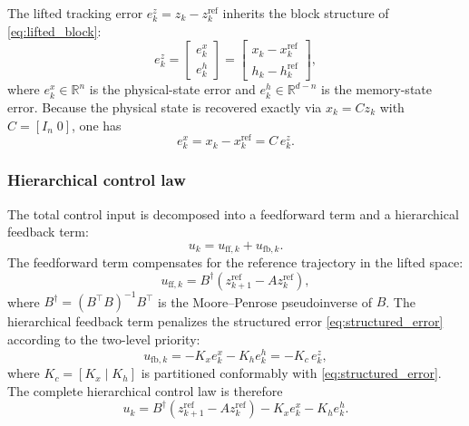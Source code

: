 \documentclass[journal]{IEEEtran}
\begin{document}
The lifted tracking error $e_k^z = z_k - z_k^{\mathrm{ref}}$ inherits the block structure of \eqref{eq:lifted_block}:
\begin{equation}
    e_k^z = \begin{bmatrix} e_k^x \\ e_k^h \end{bmatrix}
           = \begin{bmatrix} x_k - x_k^{\mathrm{ref}} \\ h_k - h_k^{\mathrm{ref}} \end{bmatrix},
    \label{eq:structured_error}
\end{equation}
where $e_k^x \in \mathbb{R}^n$ is the physical-state error and $e_k^h \in \mathbb{R}^{d-n}$ is the memory-state error. Because the physical state is recovered exactly via $x_k = Cz_k$ with $C=[I_n\;0]$, one has
\begin{equation}
    e_k^x = x_k - x_k^{\mathrm{ref}} = C\,e_k^z.
    \label{eq:phys_error_proj}
\end{equation}

\subsubsection*{Hierarchical control law}

The total control input is decomposed into a feedforward term and a hierarchical feedback term:
\begin{equation}
    u_k = u_{\mathrm{ff},k} + u_{\mathrm{fb},k}.
    \label{eq:ctrl_decomp}
\end{equation}
The feedforward term compensates for the reference trajectory in the lifted space:
\begin{equation}
    u_{\mathrm{ff},k} = B^\dagger\!\left(z_{k+1}^{\mathrm{ref}} - A z_k^{\mathrm{ref}}\right),
    \label{eq:feedforward}
\end{equation}
where $B^\dagger = (B^\top B)^{-1}B^\top$ is the Moore--Penrose pseudoinverse of $B$. The hierarchical feedback term penalizes the structured error \eqref{eq:structured_error} according to the two-level priority:
\begin{equation}
    u_{\mathrm{fb},k} = -K_x e_k^x - K_h e_k^h = -K_c\, e_k^z,
    \label{eq:hierarchical_fb}
\end{equation}
where $K_c = [K_x\;|\;K_h]$ is partitioned conformably with \eqref{eq:structured_error}. The complete hierarchical control law is therefore
\begin{equation}
    u_k = B^\dagger\!\left(z_{k+1}^{\mathrm{ref}} - A z_k^{\mathrm{ref}}\right) - K_x e_k^x - K_h e_k^h.
    \label{eq:full_ctrl}
\end{equation}
\end{document}
